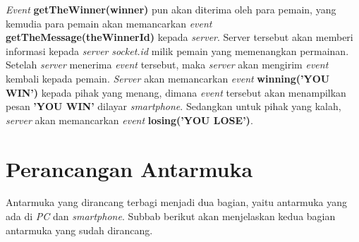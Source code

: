 \textit{Event} \textbf{getTheWinner(winner)} pun akan diterima oleh para pemain, yang kemudia para pemain akan memancarkan \textit{event} \textbf{getTheMessage(theWinnerId)} kepada \textit{server}. Server tersebut akan memberi informasi kepada \textit{server} \textit{socket.id} milik pemain yang memenangkan permainan. Setelah \textit{server} menerima \textit{event} tersebut, maka \textit{server} akan mengirim \textit{event} kembali kepada pemain. \textit{Server} akan memancarkan \textit{event} \textbf{winning('YOU WIN')} kepada pihak yang menang, dimana \textit{event} tersebut akan menampilkan pesan \textbf{'YOU WIN'} dilayar \textit{smartphone}. Sedangkan untuk pihak yang kalah, \textit{server} akan memancarkan \textit{event} \textbf{losing('YOU LOSE')}.

%


\section{Perancangan Antarmuka}
\label{sec:antarmuka}

Antarmuka yang dirancang terbagi menjadi dua bagian, yaitu antarmuka yang ada di \textit{PC} dan \textit{smartphone}. Subbab berikut akan menjelaskan kedua bagian antarmuka yang sudah dirancang. 


